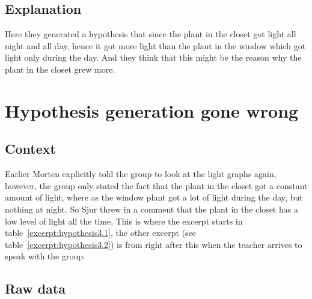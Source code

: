 \subsection{Explanation}
Here they generated a hypothesis that since the plant in the closet got light all night and all day, hence it got more light than the plant in the window which got light only during the day. And they think that this might be the reason why the plant in the closet grew more.

\section{Hypothesis generation gone wrong}

\subsection{Context}
Earlier Morten explicitly told the group to look at the light graphs again, however, the group only stated the fact that the plant in the closet got a constant amount of light, where as the window plant got a lot of light during the day, but nothing at night. So Sjur threw in a comment that the plant in the closet has a low level of light all the time. This is where the excerpt starts in table~\ref{excerpt:hypothesis3.1}, the other excerpt (see table~\ref{excerpt:hypothesis3.2}) is from right after this when the teacher arrives to speak with the group.

\subsection{Raw data}

